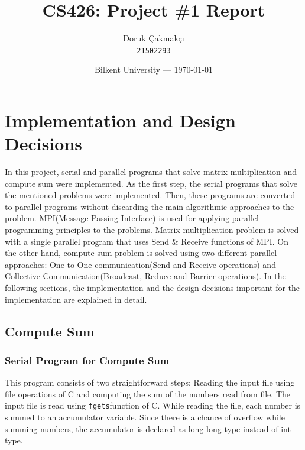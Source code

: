 \documentclass{article}
\title{CS426: Project \#1 Report} %
\author{Doruk Çakmakçı\\ \texttt{21502293}} %
\date{Bilkent University --- \today} %
\begin{document}
\maketitle %


\section{Implementation and Design Decisions} %
\qquad In this project, serial and parallel programs that solve  matrix multiplication and compute sum were implemented. As the first step, the serial programs that solve the mentioned problems were implemented. Then, these programs are converted to parallel programs without discarding the main algorithmic approaches to the problem. MPI(Message Passing Interface) is used for applying parallel programming principles to the problems. Matrix multiplication problem is solved with a single parallel program that uses Send & Receive functions of MPI. On the other hand, compute sum problem is solved using two different parallel approaches: One-to-One communication(Send and Receive operations) and Collective Communication(Broadcast, Reduce and Barrier operations). In the following sections, the implementation and the design decisions important for the implementation are explained in detail.

\subsection{Compute Sum}

\subsubsection{Serial Program for Compute Sum}
\qquad This program consists of two straightforward steps: Reading the input file using file operations of C and computing the sum of the numbers read from file. The input file is read using \lstinline{fgets}function of C. While reading the file, each number is summed to an accumulator variable. Since there is a chance of overflow while summing numbers, the accumulator is declared as long long type instead of int type.
\end{document}
